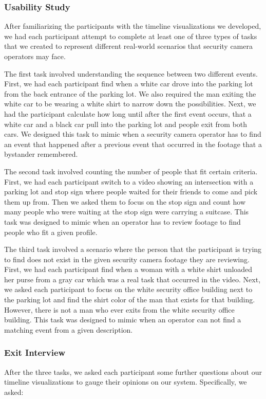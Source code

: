 \documentclass[doublespace,draft,nopageskip]{VTthesis} %
\begin{document}
\subsubsection{Usability Study}
After familiarizing the participants with the timeline visualizations we developed, we had each participant attempt to complete at least one of three types of tasks that we created to represent different real-world scenarios that security camera operators may face. 

The first task involved understanding the sequence between two different events. First, we had each participant find when a white car drove into the parking lot from the back entrance of the parking lot. We also required the man exiting the white car to be wearing a white shirt to narrow down the possibilities. Next, we had the participant calculate how long until after the first event occurs, that a white car and a black car pull into the parking lot and people exit from both cars. We designed this task to mimic when a security camera operator has to find an event that happened after a previous event that occurred in the footage that a bystander remembered.

The second task involved counting the number of people that fit certain criteria. First, we had each participant switch to a video showing an intersection with a parking lot and stop sign where people waited for their friends to come and pick them up from. Then we asked them to focus on the stop sign and count how many people who were waiting at the stop sign were carrying a suitcase. This task was designed to mimic when an operator has to review footage to find people who fit a given profile. 

The third task involved a scenario where the person that the participant is trying to find does not exist in the given security camera footage they are reviewing. First, we had each participant find when a woman with a white shirt unloaded her purse from a gray car which was a real task that occurred in the video. Next, we asked each participant to focus on the white security office building next to the parking lot and find the shirt color of the man that exists for that building. However, there is not a man who ever exits from the white security office building. This task was designed to mimic when an operator can not find a matching event from a given description.

\subsubsection{Exit Interview}
After the three tasks, we asked each participant some further questions about our timeline visualizations to gauge their opinions on our system.  Specifically, we asked: 
\end{document}
